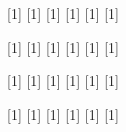 %
%
\DeclareMathOperator*{\@macros@distribution@bernoulli@name}{\textrm{Bern}}
\DeclareMathOperator*{\@macros@distribution@binomial@name}{\textrm{Bin}}
\DeclareMathOperator*{\@macros@distribution@geometric@name}{\textrm{Geom}}
\DeclareMathOperator*{\@macros@distribution@negativebinomial@name}{\textrm{NBin}}
\DeclareMathOperator*{\@macros@distribution@hypergeometric@name}{\textrm{HGeom}}
\DeclareMathOperator*{\@macros@distribution@poisson@name}{\textrm{Pois}}

[1]{} %
[1]{} %
[1]{} %
[1]{} %
[1]{} %
[1]{} %

[1]{} %
[1]{} %
[1]{} %
[1]{} %
[1]{} %
[1]{} %

[1]{} %
[1]{} %
[1]{} %
[1]{} %
[1]{} %
[1]{} %

[1]{} %
[1]{} %
[1]{} %
[1]{} %
[1]{} %
[1]{} %


%
%
\DeclareMathOperator*{\@macros@distribution@categorical@name}{\textrm{Cat}}

